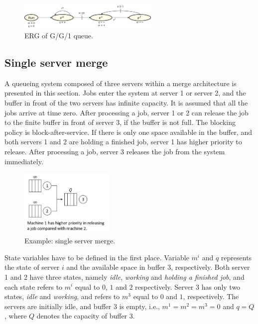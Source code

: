 \documentclass[]{interact}
\theoremstyle{plain}%
\theoremstyle{definition}
\theoremstyle{remark}
\begin{document}
\begin{figure}[h]
	\centering
	\includegraphics[width=0.6\textwidth]{Figures/ERG_GG1.png}
	\caption{ERG of G/G/1 queue.}
	\label{fig:ERG_GG1}
\end{figure}

\subsection{Single server merge}

A queueing system composed of three servers within a merge architecture is presented in this section. Jobs enter the system at server 1 or server 2, and the buffer in front of the two servers has infinite capacity. It is assumed that all the jobs arrive at time zero. After processing a job, server 1 or 2 can release the job to the finite buffer in front of server 3, if the buffer is not full. The blocking policy is block-after-service. If there is only one space available in the buffer, and both servers 1 and 2 are holding a finished job, server 1 has higher priority to release. After processing a job, server 3 releases the job from the system immediately. 

\begin{figure}[h]
	\centering
	\includegraphics[width=0.4\textwidth]{Figures/merge.png}
	\caption{Example: single server merge.}
\end{figure}

State variables have to be defined in the first place. Variable $m^i$ and $q$ represents the state of server $i$ and the available space in buffer 3, respectively. Both server 1 and 2 have three states, namely \textit{idle}, \textit{working} and \textit{holding a finished job}, and each state refers to $m^i$ equal to $0$, $1$ and $2$ respectively. Server 3 has only two states, \textit{idle} and \textit{working}, and refers to $m^3$ equal to $0$ and $1$, respectively. The servers are initially idle, and buffer 3 is empty, i.e., $m^1=m^2=m^3=0$ and $q=Q$, where $Q$ denotes the capacity of buffer 3.
\end{document}
